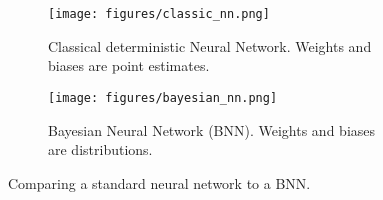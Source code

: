 \documentclass[a4paper]{article}
\begin{document}
\begin{figure}
\begin{subfigure}{0.47\textwidth}
    \centering
    \texttt{[image: figures/classic\_nn.png]}
    \caption{Classical deterministic Neural Network. Weights and biases are point estimates.}
    \label{fig:classical_nn}
    \end{subfigure}
    \hfill
\begin{subfigure}{0.47\textwidth}
    \centering
    \texttt{[image: figures/bayesian\_nn.png]}
    \caption{Bayesian Neural Network (BNN). Weights and biases are distributions.}
    \label{fig:BNN}
\end{subfigure}
\caption{Comparing a standard neural network to a BNN.}\label{fig:nn}
\end{figure}
\end{document}
